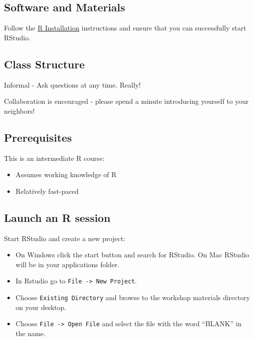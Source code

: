 \documentclass[
]{book}
\providecommand{\tightlist}{%
  \setlength{\itemsep}{0pt}\setlength{\parskip}{0pt}}
\begin{document}
\hypertarget{software-and-materials-2}{%
\subsection{Software and Materials}\label{software-and-materials-2}}

Follow the \href{./Rinstall.html}{R Installation} instructions and ensure that you can successfully start RStudio.

\hypertarget{class-structure-2}{%
\subsection{Class Structure}\label{class-structure-2}}

Informal - Ask questions at any time. Really!

Collaboration is encouraged - please spend a minute introducing yourself to your neighbors!

\hypertarget{prerequisites-2}{%
\subsection{Prerequisites}\label{prerequisites-2}}

This is an intermediate R course:

\begin{itemize}
\tightlist
\item
  Assumes working knowledge of R
\item
  Relatively fast-paced
\end{itemize}

\hypertarget{launch-an-r-session-1}{%
\subsection{Launch an R session}\label{launch-an-r-session-1}}

Start RStudio and create a new project:

\begin{itemize}
\tightlist
\item
  On Windows click the start button and search for RStudio. On Mac
  RStudio will be in your applications folder.
\item
  In Rstudio go to \texttt{File\ -\textgreater{}\ New\ Project}.
\item
  Choose \texttt{Existing\ Directory} and browse to the workshop materials directory on your desktop.
\item
  Choose \texttt{File\ -\textgreater{}\ Open\ File} and select the file with the word ``BLANK'' in the name.
\end{itemize}
\end{document}
